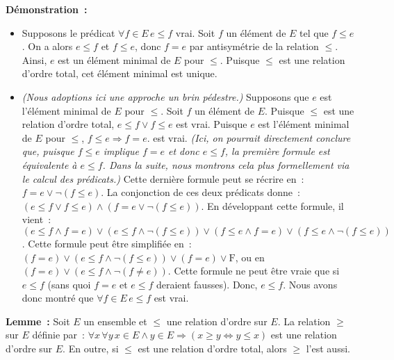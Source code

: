 \noindent\textbf{Démonstration :}
\begin{itemize}[nosep]
    \item Supposons le prédicat $\forall f \in E \, e \leq f$ vrai. 
        Soit $f$ un élément de $E$ tel que $f \leq e$. 
        On a alors $e \leq f$ et $f \leq e$, donc $f = e$ par antisymétrie de la relation $\leq$. 
        Ainsi, $e$ est un élément minimal de $E$ pour $\leq$.
        Puisque $\leq$ est une relation d'ordre total, cet élément minimal est unique.
    \item \textit{(Nous adoptions ici une approche un brin pédestre.)} 
        Supposons que $e$ est l'élément minimal de $E$ pour $\leq$.
        Soit $f$ un élément de $E$. 
        Puisque $\leq$ est une relation d'ordre total, $e \leq f \vee f \leq e$ est vrai.
        Puisque $e$ est l'élément minimal de $E$ pour $\leq$, $f \leq e \Rightarrow f = e$. est vrai. 
        \textit{(Ici, on pourrait directement conclure que, puisque $f \leq e$ implique $f = e$ et donc $e \leq f$, la première formule est équivalente à $e \leq f$. Dans la suite, nous montrons cela plus formellement \emph{via} le calcul des prédicats.)}
        Cette dernière formule peut se récrire en : $f = e \vee \neg (f \leq e)$.
        La conjonction de ces deux prédicats donne : $(e \leq f \vee f \leq e) \wedge (f = e \vee \neg (f \leq e))$.
        En développant cette formule, il vient : $(e \leq f \wedge f = e) \vee (e \leq f \wedge \neg (f \leq e)) \vee (f \leq e \wedge f = e) \vee (f \leq e \wedge \neg (f \leq e))$.
        Cette formule peut être simplifiée en : $(f = e) \vee (e \leq f \wedge \neg (f \leq e)) \vee (f = e) \vee \mathrm{F}$, 
        ou en $(f = e) \vee (e \leq f \wedge \neg (f \neq e))$.
        Cette formule ne peut être vraie que si $e \leq f$ (sans quoi $f = e$ et $e \leq f$ deraient fausses).
        Donc, $e \leq f$.
        Nous avons donc montré que $\forall f \in E \, e \leq f$ est vrai.
\end{itemize}
    
   \done 

\medskip

\noindent\textbf{Lemme :} Soit $E$ un ensemble et $\leq$ une relation d'ordre sur $E$. 
    La relation $\geq$ sur $E$ définie par : $\forall x \, \forall y \, x \in E \wedge y \in E \Rightarrow (x \geq y \Leftrightarrow y \leq x)$ est une relation d'ordre sur $E$. 
    En outre, si $\leq$ est une relation d'ordre total, alors $\geq$ l'est aussi.

\medskip

